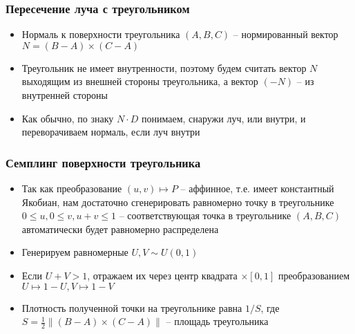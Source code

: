 \documentclass[handout,10pt]{beamer}
\begin{document}
\begin{frame}
\frametitle{Пересечение луча с треугольником}
\begin{itemize}
\item Нормаль к поверхности треугольника \begin{math}(A,B,C)\end{math} -- нормированный вектор \begin{math}N = (B-A)\times(C-A)\end{math}
\pause
\item Треугольник не имеет внутренности, поэтому будем считать вектор \begin{math}N\end{math} выходящим из внешней стороны треугольника, а вектор \begin{math}(-N)\end{math} -- из внутренней стороны
\pause
\item Как обычно, по знаку \begin{math}N\cdot D\end{math} понимаем, снаружи луч, или внутри, и переворачиваем нормаль, если луч внутри
\end{itemize}
\end{frame}

\begin{frame}
\frametitle{Семплинг поверхности треугольника}
\begin{itemize}
\item Так как преобразование \begin{math}(u, v) \mapsto P\end{math} -- аффинное, т.е. имеет константный Якобиан, нам достаточно сгенерировать равномерно точку в треугольнике \begin{math}0\leq u, 0\leq v, u+v \leq 1\end{math} -- соответствующая точка в треугольнике \begin{math}(A,B,C)\end{math} автоматически будет равномерно распределена
\pause
\item Генерируем равномерные \begin{math}U,V \sim U(0,1)\end{math}
\pause
\item Если \begin{math}U+V>1\end{math}, отражаем их через центр квадрата \begin{math}[0,1]\times [0,1]\end{math} преобразованием \begin{math}U \mapsto 1-U, V \mapsto 1-V\end{math}
\pause
\item Плотность полученной точки на треугольнике равна \begin{math}1/S\end{math}, где \begin{math}S = \frac{1}{2}\| (B-A)\times (C-A)\|\end{math} -- площадь треугольника
\end{itemize}
\end{frame}
\end{document}
